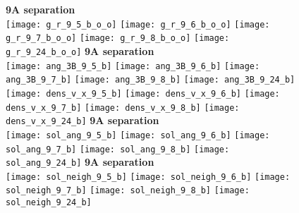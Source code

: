 \documentclass[journal=acsnano,manuscript=article]{achemso}
\begin{document}
\begin{figure}[h!]
	\centering
	\textbf{9A separation} \\
	\texttt{[image: g\_r\_9\_5\_b\_o\_o]} 
	\texttt{[image: g\_r\_9\_6\_b\_o\_o]}
	\texttt{[image: g\_r\_9\_7\_b\_o\_o]}
	\texttt{[image: g\_r\_9\_8\_b\_o\_o]}
	\texttt{[image: g\_r\_9\_24\_b\_o\_o]}
	\textbf{9A separation} \\
	\texttt{[image: ang\_3B\_9\_5\_b]} 
	\texttt{[image: ang\_3B\_9\_6\_b]}
	\texttt{[image: ang\_3B\_9\_7\_b]}
	\texttt{[image: ang\_3B\_9\_8\_b]}
	\texttt{[image: ang\_3B\_9\_24\_b]} \\
	
	\texttt{[image: dens\_v\_x\_9\_5\_b]} 
	\texttt{[image: dens\_v\_x\_9\_6\_b]}
	\texttt{[image: dens\_v\_x\_9\_7\_b]}
	\texttt{[image: dens\_v\_x\_9\_8\_b]}
	\texttt{[image: dens\_v\_x\_9\_24\_b]}
	\textbf{9A separation} \\
	\texttt{[image: sol\_ang\_9\_5\_b]} 
	\texttt{[image: sol\_ang\_9\_6\_b]}
	\texttt{[image: sol\_ang\_9\_7\_b]}
	\texttt{[image: sol\_ang\_9\_8\_b]}
	\texttt{[image: sol\_ang\_9\_24\_b]}
	\textbf{9A separation} \\
	\texttt{[image: sol\_neigh\_9\_5\_b]} 
	\texttt{[image: sol\_neigh\_9\_6\_b]}
	\texttt{[image: sol\_neigh\_9\_7\_b]}
	\texttt{[image: sol\_neigh\_9\_8\_b]}
	\texttt{[image: sol\_neigh\_9\_24\_b]}
	\label{fig:gr_9extra}
\end{figure}
\end{document}

